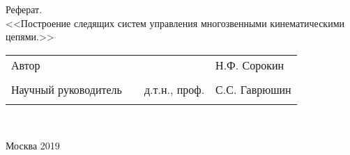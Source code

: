 \documentclass[a4paper]{article}
\begin{document}
\date{27 ноября 2017}





\begin{center}
\hfill \break
\hfill\break
\hfill \break
\hfill \break
\hfill \break
\hfill \break
\hfill \break
\hfill \break
\hfill \break
\large{Реферат.}\\
\large{<<Построение следящих систем управления многозвенными кинематическими цепями.>>}\\
\hfill \break
\hfill \break
\hfill \break
\hfill \break
\hfill \break
\hfill \break
\hfill \break
\hfill \break
\end{center}
 
\normalsize{ 
\begin{tabular}{lccl}
Автор  & \underline{\hspace{3cm}} & &Н.Ф. Сорокин\\\\
Научный руководитель & \underline{\hspace{3cm}}& д.т.н., проф. & С.С. Гаврюшин \\\\
\end{tabular}
}\\
\hfill \break
\hfill \break
\hfill \break
\hfill \break
\begin{center} Москва 2019 \end{center}
\thispagestyle{empty} %
\newpage






\tableofcontents





\newcommand{\cinput}[1]{
	
}

\cinput{src/introduction.tex}
\cinput{src/ctrobj.tex}
\cinput{src/htrans.tex}
\cinput{src/frames.tex}
\cinput{src/straight.tex}
\cinput{src/inverse.tex}
\cinput{src/track.tex}
\cinput{src/lerp.tex}
\cinput{src/restr_coord.tex}
\cinput{src/restr_traj.tex}
\cinput{src/localbase.tex}
\cinput{src/tree.tex}
\cinput{src/findings.tex}
\cinput{src/litres.tex}
\end{document}
